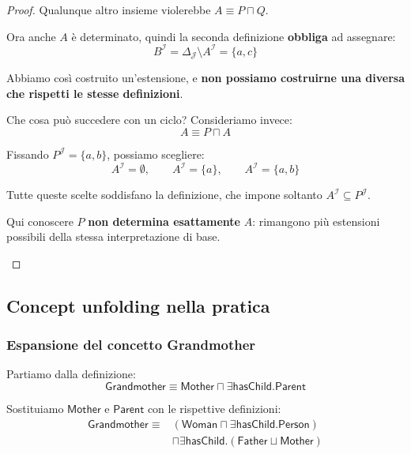 \begin{proof}
    Qualunque altro insieme violerebbe $A \equiv P \sqcap Q$.

    Ora anche $A$ è determinato, quindi la seconda
    definizione \textbf{obbliga} ad assegnare:
    \[
        B^{\mathcal{I}} =
        \Delta_{\mathcal{J}} \setminus A^{\mathcal{I}}
        = \{a,c\}
    \]

    Abbiamo così costruito un'estensione, e
    \textbf{non possiamo costruirne una diversa che
    rispetti le stesse definizioni}.

    \begin{observation}{Che cosa può succedere con un ciclo?}
        Consideriamo invece:
        \[
            A \equiv P \sqcap A
        \]

        Fissando $P^{\mathcal{J}} = \{a,b\}$, possiamo scegliere:
        \[
            A^{\mathcal{I}} = \emptyset,
            \qquad A^{\mathcal{I}} = \{a\},
            \qquad A^{\mathcal{I}} = \{a,b\}
        \]

        Tutte queste scelte soddisfano la definizione, che impone
        soltanto $A^{\mathcal{I}} \subseteq P^{\mathcal{J}}$.

        Qui conoscere $P$ \textbf{non determina esattamente} $A$:
        rimangono più estensioni possibili della stessa
        interpretazione di base.
    \end{observation}
\end{proof}

\subsection{Concept unfolding nella pratica}
\subsubsection{Espansione del concetto Grandmother}

Partiamo dalla definizione:
\[
    \mathsf{Grandmother} \equiv
    \mathsf{Mother} \sqcap
    \exists\mathsf{hasChild}.\mathsf{Parent}
\]

Sostituiamo $\mathsf{Mother}$ e $\mathsf{Parent}$ con le
rispettive definizioni:
\[
\begin{aligned}
    \mathsf{Grandmother} \equiv {} &
    (\mathsf{Woman} \sqcap
    \exists\mathsf{hasChild}.\mathsf{Person})\\
    & \sqcap \exists\mathsf{hasChild}.
    (\mathsf{Father} \sqcup \mathsf{Mother})
\end{aligned}
\]

